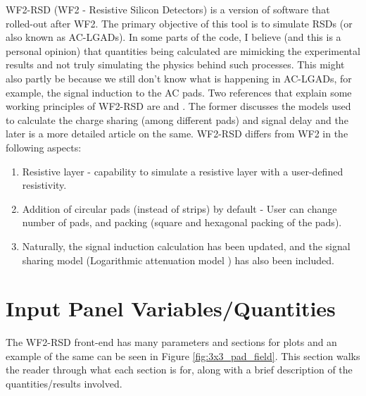 \documentclass[11pt]{article}
\begin{document}
WF2-RSD (WF2 - Resistive Silicon Detectors) is a version of software that rolled-out after WF2. The primary objective of this tool is to simulate RSDs (or also known as AC-LGADs). In some parts of the code, I believe (and this is a personal opinion) that quantities being calculated are mimicking the experimental results and not truly simulating the physics behind such processes. This might also partly be because we still don't know what is happening in AC-LGADs, for example, the signal induction to the AC pads.
\newline
Two references that explain some working principles of WF2-RSD are \cite{wf2-rsd-working-principles} and \cite{Tornago2021}. The former discusses the models used to calculate the charge sharing (among different pads) and signal delay and the later is a more detailed article on the same.
\newline
WF2-RSD differs from WF2 in the following aspects:
\begin{enumerate}
    \item Resistive layer - capability to simulate a resistive layer with a user-defined resistivity.
    \item Addition of circular pads (instead of strips) by default - User can change number of pads, and packing (square and hexagonal packing of the pads).
    \item Naturally, the signal induction calculation has been updated, and the signal sharing model (Logarithmic attenuation model \cite{Tornago2021}) has also been included.
\end{enumerate}

\section{Input Panel Variables/Quantities}
The WF2-RSD front-end has many parameters and sections for plots and an example of the same can be seen in Figure \ref{fig:3x3_pad_field}. This section walks the reader through what each section is for, along with a brief description of the quantities/results involved.
\end{document}

